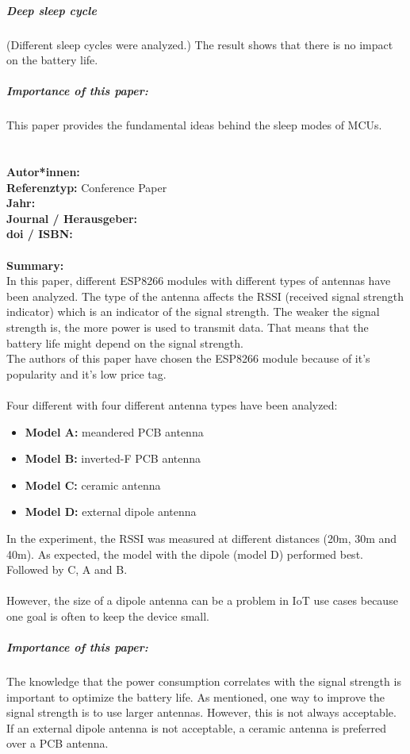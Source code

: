 \documentclass{report}
\newcommand{\createConferencePaperHeader}[1]{
    {\let\clearpage\relax \chapter{\citetitle{#1}}}
    \noindent
    \textbf{Autor*innen:} \citeauthor{#1} \\
    \textbf{Referenztyp:} Conference Paper\\
    \textbf{Jahr:} \citeyear{#1} \\
    \textbf{Journal / Herausgeber:} \citelist{#1}{publisher}\\
    \textbf{doi / ISBN:} \citefield{#1}{doi} \\\\
    \textbf{Summary:}\\
}
\begin{document}
\paragraph{Deep sleep cycle} (Different sleep cycles were analyzed.)
The result shows that there is no impact on the battery life.
\\
\paragraph{Importance of this paper:}
This paper provides the fundamental ideas behind the sleep modes of MCUs.





\createConferencePaperHeader{yoppy_rssi_2018}
In this paper, different ESP8266 modules with different types of antennas have been analyzed.
The type of the antenna affects the RSSI (received signal strength indicator) which is an indicator of the signal strength.
The weaker the signal strength is, the more power is used to transmit data.
That means that the battery life might depend on the signal strength.
\\
The authors of this paper have chosen the ESP8266 module because of it's popularity and it's low price tag.
\\\\
Four different with four different antenna types have been analyzed:\\
\begin{itemize}
    \item \textbf{Model A:} meandered PCB antenna
    \item \textbf{Model B:} inverted-F PCB antenna
    \item \textbf{Model C:} ceramic antenna
    \item \textbf{Model D:} external dipole antenna
\end{itemize}

In the experiment, the RSSI was measured at different distances (20m, 30m and 40m).
As expected, the model with the dipole (model D) performed best. Followed by C, A and B.
\\\\
However, the size of a dipole antenna can be a problem in IoT use cases because one goal is often to keep the device small.
\\
\paragraph{Importance of this paper:}
The knowledge that the power consumption correlates with the signal strength is important to optimize the battery life.
As mentioned, one way to improve the signal strength is to use larger antennas. However, this is not always acceptable.
If an external dipole antenna is not acceptable, a ceramic antenna is preferred over a PCB antenna.
\end{document}
